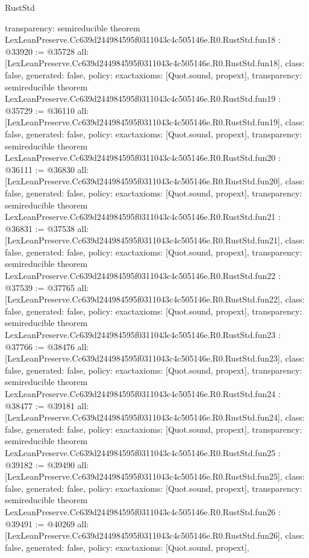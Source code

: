 \begin{lexlean}{RustStd}
\begin{coremodule}
{  transparency: semireducible
}
theorem LexLeanPreserve.Cc639d244984595f0311043c4c505146e.R0.RustStd.fun18 : @33920 := @35728 {
  all: [LexLeanPreserve.Cc639d244984595f0311043c4c505146e.R0.RustStd.fun18],
  class: false,
  generated: false,
  policy: exact{axioms: [Quot.sound, propext]},
  transparency: semireducible
}
theorem LexLeanPreserve.Cc639d244984595f0311043c4c505146e.R0.RustStd.fun19 : @35729 := @36110 {
  all: [LexLeanPreserve.Cc639d244984595f0311043c4c505146e.R0.RustStd.fun19],
  class: false,
  generated: false,
  policy: exact{axioms: [Quot.sound, propext]},
  transparency: semireducible
}
theorem LexLeanPreserve.Cc639d244984595f0311043c4c505146e.R0.RustStd.fun20 : @36111 := @36830 {
  all: [LexLeanPreserve.Cc639d244984595f0311043c4c505146e.R0.RustStd.fun20],
  class: false,
  generated: false,
  policy: exact{axioms: [Quot.sound, propext]},
  transparency: semireducible
}
theorem LexLeanPreserve.Cc639d244984595f0311043c4c505146e.R0.RustStd.fun21 : @36831 := @37538 {
  all: [LexLeanPreserve.Cc639d244984595f0311043c4c505146e.R0.RustStd.fun21],
  class: false,
  generated: false,
  policy: exact{axioms: [Quot.sound, propext]},
  transparency: semireducible
}
theorem LexLeanPreserve.Cc639d244984595f0311043c4c505146e.R0.RustStd.fun22 : @37539 := @37765 {
  all: [LexLeanPreserve.Cc639d244984595f0311043c4c505146e.R0.RustStd.fun22],
  class: false,
  generated: false,
  policy: exact{axioms: [Quot.sound, propext]},
  transparency: semireducible
}
theorem LexLeanPreserve.Cc639d244984595f0311043c4c505146e.R0.RustStd.fun23 : @37766 := @38476 {
  all: [LexLeanPreserve.Cc639d244984595f0311043c4c505146e.R0.RustStd.fun23],
  class: false,
  generated: false,
  policy: exact{axioms: [Quot.sound, propext]},
  transparency: semireducible
}
theorem LexLeanPreserve.Cc639d244984595f0311043c4c505146e.R0.RustStd.fun24 : @38477 := @39181 {
  all: [LexLeanPreserve.Cc639d244984595f0311043c4c505146e.R0.RustStd.fun24],
  class: false,
  generated: false,
  policy: exact{axioms: [Quot.sound, propext]},
  transparency: semireducible
}
theorem LexLeanPreserve.Cc639d244984595f0311043c4c505146e.R0.RustStd.fun25 : @39182 := @39490 {
  all: [LexLeanPreserve.Cc639d244984595f0311043c4c505146e.R0.RustStd.fun25],
  class: false,
  generated: false,
  policy: exact{axioms: [Quot.sound, propext]},
  transparency: semireducible
}
theorem LexLeanPreserve.Cc639d244984595f0311043c4c505146e.R0.RustStd.fun26 : @39491 := @40269 {
  all: [LexLeanPreserve.Cc639d244984595f0311043c4c505146e.R0.RustStd.fun26],
  class: false,
  generated: false,
  policy: exact{axioms: [Quot.sound, propext]},
}
\end{coremodule}
\end{lexlean}
